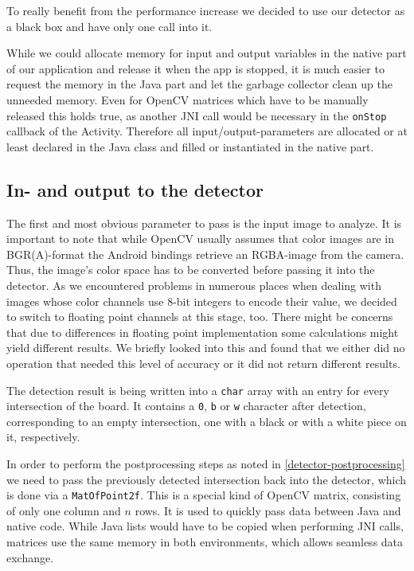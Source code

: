 	To really benefit from the performance increase we decided to use our detector as a black box and have only one call into it.

	While we could allocate memory for input and output variables in the native part of our application and release it when the app is stopped, it is much easier to request the memory in the Java part and let the garbage collector clean up the unneeded memory. Even for OpenCV matrices which have to be manually released this holds true, as another JNI call would be necessary in the \texttt{onStop} callback of the Activity. Therefore all input/output-parameters are allocated or at least declared in the Java class and filled or instantiated in the native part.

	\subsection{In- and output to the detector}
	\label{android-detector-inoutput}
	The first and most obvious parameter to pass is the input image to analyze. It is important to note that while OpenCV usually assumes that color images are in BGR(A)-format the Android bindings retrieve an RGBA-image from the camera. Thus, the image's color space has to be converted before passing it into the detector. As we encountered problems in numerous places when dealing with images whose color channels use 8-bit integers to encode their value, we decided to switch to floating point channels at this stage, too. There might be concerns that due to differences in floating point implementation some calculations might yield different results. We briefly looked into this and found that we either did no operation that needed this level of accuracy or it did not return different results.

	The detection result is being written into a \texttt{char} array with an entry for every intersection of the board. It contains a \texttt{0}, \texttt{b} or \texttt{w} character after detection, corresponding to an empty intersection, one with a black or with a white piece on it, respectively.

	In order to perform the postprocessing steps as noted in \autoref{detector-postprocessing} we need to pass the previously detected intersection back into the detector, which is done via a \texttt{MatOfPoint2f}. This is a special kind of OpenCV matrix, consisting of only one column and $n$ rows. It is used to quickly pass data between Java and native code. While Java lists would have to be copied when performing JNI calls, matrices use the same memory in both environments, which allows seamless data exchange.

